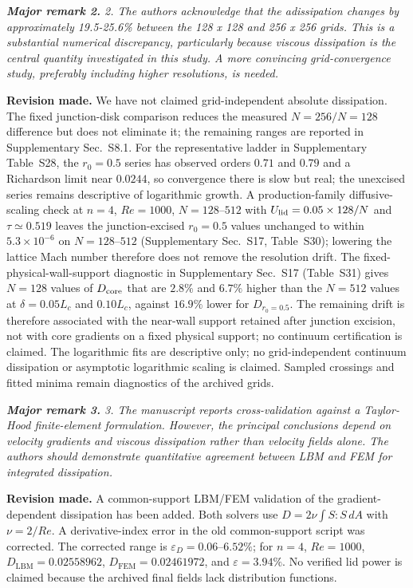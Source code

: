 \documentclass[11pt,a4paper]{article}
\newcommand{\qcomment}[1]{\textcolor{deepblue}{\itshape #1}}
\newcommand{\revwork}[1]{\textbf{\textcolor{revgreen}{#1}}}
\begin{document}
\medskip
\noindent\qcomment{\textbf{Major remark 2.} 2. The authors acknowledge that the adissipation changes by approximately 19.5-25.6\% between the 128 x 128 and 256 x 256 grids. This is a substantial numerical discrepancy, particularly because viscous dissipation is the central quantity investigated in this study. A more convincing grid-convergence study, preferably including higher resolutions, is needed.}

\noindent\revwork{Revision made.} We have not claimed grid-independent absolute dissipation. The fixed junction-disk comparison reduces the measured $N=256/N=128$ difference but does not eliminate it; the remaining ranges are reported in Supplementary Sec.~S8.1. For the representative ladder in Supplementary Table~S28, the $r_0=0.5$ series has observed orders $0.71$ and $0.79$ and a Richardson limit near $0.0244$, so convergence there is slow but real; the unexcised series remains descriptive of logarithmic growth. A production-family diffusive-scaling check at $n=4$, $Re=1000$, $N=128$--$512$ with $U_{\rm lid}=0.05\times128/N$ and $\tau\simeq0.519$ leaves the junction-excised $r_0=0.5$ values unchanged to within $5.3\times10^{-6}$ on $N=128$--$512$ (Supplementary Sec.~S17, Table~S30); lowering the lattice Mach number therefore does not remove the resolution drift. The fixed-physical-wall-support diagnostic in Supplementary Sec.~S17 (Table~S31) gives $N=128$ values of $D_{\rm core}$ that are $2.8\%$ and $6.7\%$ higher than the $N=512$ values at $\delta=0.05L_c$ and $0.10L_c$, against $16.9\%$ lower for $D_{r_0=0.5}$. The remaining drift is therefore associated with the near-wall support retained after junction excision, not with core gradients on a fixed physical support; no continuum certification is claimed. The logarithmic fits are descriptive only; no grid-independent continuum dissipation or asymptotic logarithmic scaling is claimed. Sampled crossings and fitted minima remain diagnostics of the archived grids.

\medskip
\noindent\qcomment{\textbf{Major remark 3.} 3. The manuscript reports cross-validation against a Taylor-Hood finite-element formulation. However, the principal conclusions depend on velocity gradients and viscous dissipation rather than velocity fields alone. The authors should demonstrate quantitative agreement between LBM and FEM for integrated dissipation.}

\noindent\revwork{Revision made.} A common-support LBM/FEM validation of the gradient-dependent dissipation has been added. Both solvers use $D=2\nu\int S:S\,dA$ with $\nu=2/Re$. A derivative-index error in the old common-support script was corrected. The corrected range is $\varepsilon_D=0.06$--$6.52\%$; for $n=4$, $Re=1000$, $D_{\mathrm{LBM}}=0.02558962$, $D_{\mathrm{FEM}}=0.02461972$, and $\varepsilon=3.94\%$. No verified lid power is claimed because the archived final fields lack distribution functions.
\end{document}
